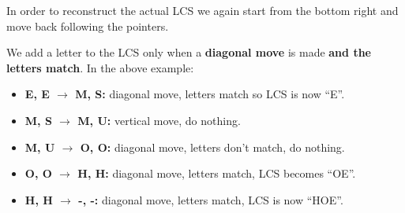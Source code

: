 \documentclass[../main.tex]{subfiles}
\begin{document}
In order to reconstruct the actual LCS we again start from the bottom right and move back following the pointers.

We add a letter to the LCS only when a \textbf{diagonal move} is made \textbf{and the letters match}. In the above example:
\begin{itemize}
\item \textbf{E, E $\rightarrow$ M, S:} diagonal move, letters match so LCS is now ``E''.
\item \textbf{M, S $\rightarrow$ M, U:} vertical move, do nothing.
\item \textbf{M, U $\rightarrow$ O, O:} diagonal move, letters don't match, do nothing.
\item \textbf{O, O $\rightarrow$ H, H:} diagonal move, letters match, LCS becomes ``OE''.
\item \textbf{H, H $\rightarrow$ -, -:} diagonal move, letters match, LCS is now ``HOE''.
\end{itemize}
\end{document}
